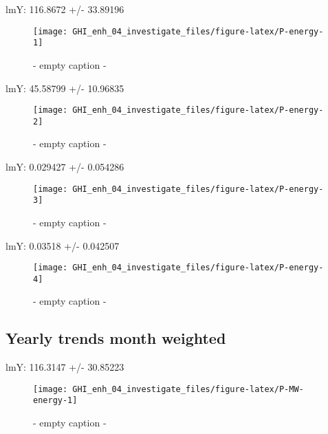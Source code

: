 \documentclass[
  10pt,
  a4paper,oneside]{article}
\begin{document}
lmY: 116.8672 +/- 33.89196

\begin{figure}[H]

{\centering \texttt{[image: GHI\_enh\_04\_investigate\_files/figure-latex/P-energy-1]} 

}

\caption{ - empty caption - }\label{fig:P-energy-1}
\end{figure}

lmY: 45.58799 +/- 10.96835

\begin{figure}[H]

{\centering \texttt{[image: GHI\_enh\_04\_investigate\_files/figure-latex/P-energy-2]} 

}

\caption{ - empty caption - }\label{fig:P-energy-2}
\end{figure}

lmY: 0.029427 +/- 0.054286

\begin{figure}[H]

{\centering \texttt{[image: GHI\_enh\_04\_investigate\_files/figure-latex/P-energy-3]} 

}

\caption{ - empty caption - }\label{fig:P-energy-3}
\end{figure}

lmY: 0.03518 +/- 0.042507

\begin{figure}[H]

{\centering \texttt{[image: GHI\_enh\_04\_investigate\_files/figure-latex/P-energy-4]} 

}

\caption{ - empty caption - }\label{fig:P-energy-4}
\end{figure}

\newpage

\hypertarget{yearly-trends-month-weighted}{%
\subsection{Yearly trends month weighted}\label{yearly-trends-month-weighted}}

lmY: 116.3147 +/- 30.85223

\begin{figure}[H]

{\centering \texttt{[image: GHI\_enh\_04\_investigate\_files/figure-latex/P-MW-energy-1]} 

}

\caption{ - empty caption - }\label{fig:P-MW-energy-1}
\end{figure}
\end{document}
